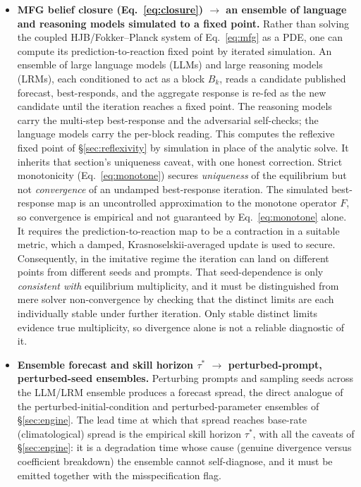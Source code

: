 \documentclass[11pt]{article}
\begin{document}
\begin{itemize}[itemsep=3pt,leftmargin=1.4em]
\item \textbf{MFG belief closure (Eq.~\eqref{eq:closure}) $\rightarrow$ an ensemble of language and reasoning models simulated to a fixed point.} Rather than solving the coupled HJB/Fokker--Planck system of Eq.~\eqref{eq:mfg} as a PDE, one can compute its prediction-to-reaction fixed point by iterated simulation. An ensemble of large language models (LLMs) and large reasoning models (LRMs), each conditioned to act as a block $B_k$, reads a candidate published forecast, best-responds, and the aggregate response is re-fed as the new candidate until the iteration reaches a fixed point. The reasoning models carry the multi-step best-response and the adversarial self-checks; the language models carry the per-block reading. This computes the reflexive fixed point of \S\ref{sec:reflexivity} by simulation in place of the analytic solve. It inherits that section's uniqueness caveat, with one honest correction. Strict monotonicity (Eq.~\eqref{eq:monotone}) secures \emph{uniqueness} of the equilibrium but not \emph{convergence} of an undamped best-response iteration. The simulated best-response map is an uncontrolled approximation to the monotone operator $F$, so convergence is empirical and not guaranteed by Eq.~\eqref{eq:monotone} alone. It requires the prediction-to-reaction map to be a contraction in a suitable metric, which a damped, Krasnoselskii-averaged update is used to secure. Consequently, in the imitative regime the iteration can land on different points from different seeds and prompts. That seed-dependence is only \emph{consistent with} equilibrium multiplicity, and it must be distinguished from mere solver non-convergence by checking that the distinct limits are each individually stable under further iteration. Only stable distinct limits evidence true multiplicity, so divergence alone is not a reliable diagnostic of it.
\item \textbf{Ensemble forecast and skill horizon $\tau^\ast$ $\rightarrow$ perturbed-prompt, perturbed-seed ensembles.} Perturbing prompts and sampling seeds across the LLM/LRM ensemble produces a forecast spread, the direct analogue of the perturbed-initial-condition and perturbed-parameter ensembles of \S\ref{sec:engine}. The lead time at which that spread reaches base-rate (climatological) spread is the empirical skill horizon $\tau^\ast$, with all the caveats of \S\ref{sec:engine}: it is a degradation time whose cause (genuine divergence versus coefficient breakdown) the ensemble cannot self-diagnose, and it must be emitted together with the misspecification flag.

\end{itemize}
\end{document}
